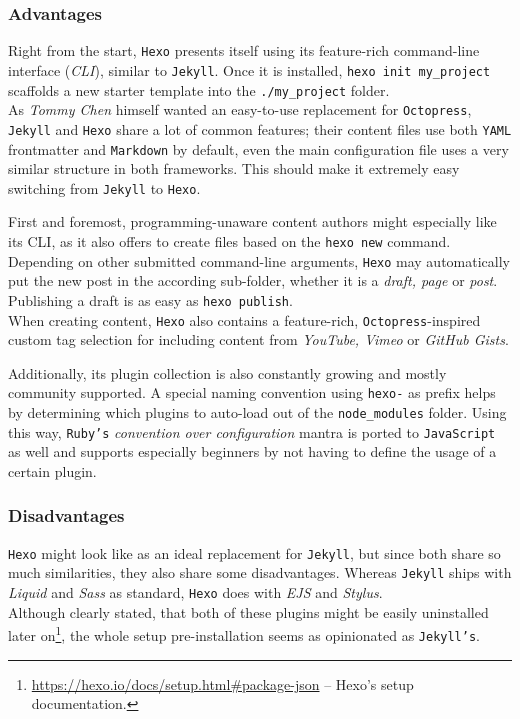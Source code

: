 \subsubsection{Advantages}
Right from the start, \texttt{Hexo} presents itself using its feature-rich command-line interface (\emph{CLI}), similar to \texttt{Jekyll}. Once it is installed, \texttt{hexo init my\_project} scaffolds a new starter template into the \texttt{./my\_project} folder.\\
As \emph{Tommy Chen} himself wanted an easy-to-use replacement for \texttt{Octopress}, \texttt{Jekyll} and \texttt{Hexo} share a lot of common features; their content files use both \texttt{YAML} frontmatter and \texttt{Markdown} by default, even the main configuration file uses a very similar structure in both frameworks. This should make it extremely easy switching from \texttt{Jekyll} to \texttt{Hexo}.

First and foremost, programming-unaware content authors might especially like its CLI, as it also offers to create files based on the \texttt{hexo new} command. Depending on other submitted command-line arguments, \texttt{Hexo} may automatically put the new post in the according sub-folder, whether it is a \emph{draft, page} or \emph{post}. Publishing a draft is as easy as \texttt{hexo publish}.\\
When creating content, \texttt{Hexo} also contains a feature-rich, \texttt{Octopress}-inspired custom tag selection for including content from \emph{YouTube, Vimeo} or \emph{GitHub Gists}.

Additionally, its plugin collection is also constantly growing and mostly community supported. A special naming convention using \texttt{hexo-} as prefix helps by determining which plugins to auto-load out of the \texttt{node\_modules} folder. Using this way, \texttt{Ruby's} \emph{convention over configuration} mantra is ported to \texttt{JavaScript} as well and supports especially beginners by not having to define the usage of a certain plugin.

\subsubsection{Disadvantages}
\texttt{Hexo} might look like as an ideal replacement for \texttt{Jekyll}, but since both share so much similarities, they also share some disadvantages. Whereas \texttt{Jekyll} ships with \emph{Liquid} and \emph{Sass} as standard, \texttt{Hexo} does with \emph{EJS} and \emph{Stylus}.\\
Although clearly stated, that both of these plugins might be easily uninstalled later on\footnote{\url{https://hexo.io/docs/setup.html\#package-json} -- Hexo's setup documentation.}, the whole setup pre-installation seems as opinionated as \texttt{Jekyll's}.


